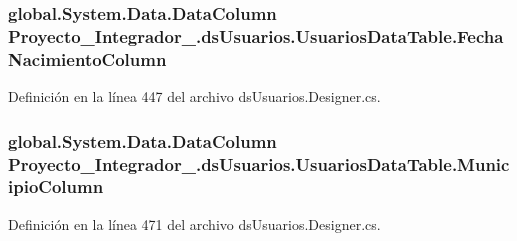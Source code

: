 \hypertarget{class_proyecto___integrador__3_1_1ds_usuarios_1_1_usuarios_data_table_a4c55af9308924a62ce21d93b85837246}{
\subsubsection[{Fecha\-Nacimiento\-Column}]{\setlength{\rightskip}{0pt plus 5cm}global.\-System.\-Data.\-Data\-Column Proyecto\-\_\-\-Integrador\-\_.\-ds\-Usuarios.\-Usuarios\-Data\-Table.\-Fecha\-Nacimiento\-Column\hspace{0.3cm}{\ttfamily [get]}}}\label{class_proyecto___integrador__3_1_1ds_usuarios_1_1_usuarios_data_table_a4c55af9308924a62ce21d93b85837246}


Definición en la línea 447 del archivo ds\-Usuarios.\-Designer.\-cs.

\hypertarget{class_proyecto___integrador__3_1_1ds_usuarios_1_1_usuarios_data_table_aa62b66be9729351bbc91dcf69f60f0a0}{
\subsubsection[{Municipio\-Column}]{\setlength{\rightskip}{0pt plus 5cm}global.\-System.\-Data.\-Data\-Column Proyecto\-\_\-\-Integrador\-\_.\-ds\-Usuarios.\-Usuarios\-Data\-Table.\-Municipio\-Column\hspace{0.3cm}{\ttfamily [get]}}}\label{class_proyecto___integrador__3_1_1ds_usuarios_1_1_usuarios_data_table_aa62b66be9729351bbc91dcf69f60f0a0}


Definición en la línea 471 del archivo ds\-Usuarios.\-Designer.\-cs.

